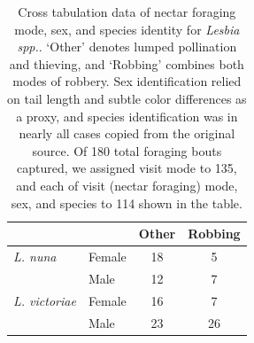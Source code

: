 \documentclass[fleqn,10pt,lineno]{wlpeerj}
\begin{document}
\clearpage




\clearpage

\begin{table}[ht]
\caption{\label{tab:contingency-table} Cross tabulation data of nectar foraging mode, sex, and species identity for \textit{Lesbia spp.}. `Other' denotes lumped pollination and thieving, and `Robbing' combines both modes of robbery. Sex identification relied on tail length and subtle color differences as a proxy, and species identification was in nearly all cases copied from the original source. Of 180 total foraging bouts captured, we assigned visit mode to 135, and each of visit (nectar foraging) mode, sex, and species to 114 shown in the table.}
\centering
\begin{tabular}{@{\vrule height 8pt depth 4pt width 0pt}llcc}
           			& 		& Other 	& Robbing \\ \hline
    {\em L. nuna} 	& Female 	& 18 	& 5 \\
    				& Male 	& 12 	& 7 \\ \hline
   {\em L. victoriae} 	& Female 	& 16 	& 7 \\
    				& Male 	& 23	& 26 \\ \hline
\end{tabular}
\end{table}
\clearpage



\end{document}
